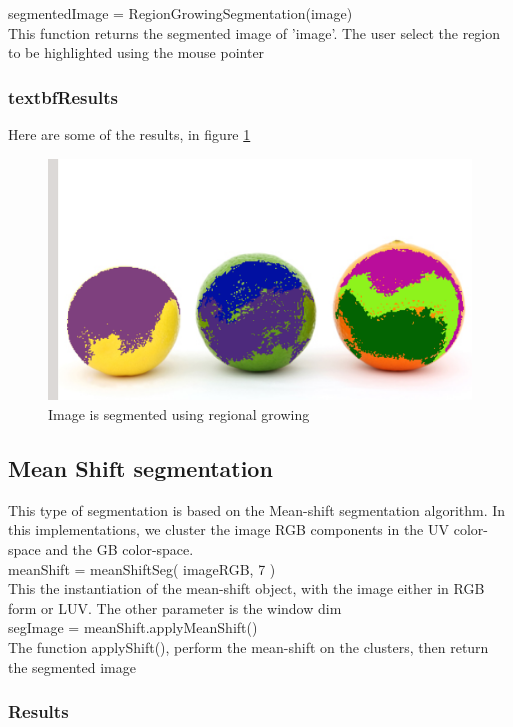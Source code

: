 \documentclass[letterpaper, 12 pt, conference ,onecolumn]{ieeeconf}  %
\begin{document}
segmentedImage = RegionGrowingSegmentation(image)
\\
This function returns the segmented image of 'image'. The user select the region to be highlighted using the mouse pointer
\subsubsection*{textbf{Results}}  

Here are some of the results, in figure \ref{fig:regional-growing}
\begin{figure}[h!]
\includegraphics[width=0.4\paperwidth]{regional-growing/regional-growing}
\centering
\caption{Image is segmented using regional growing }
\label{fig:regional-growing}
\end{figure}

\subsection*{Mean Shift segmentation}
This type of segmentation is based on the Mean-shift segmentation algorithm. In this  implementations, we cluster the image RGB components in the UV color-space and the GB color-space.
\\
meanShift = meanShiftSeg( imageRGB, 7 )
\\This the instantiation of the mean-shift object, with the image either in RGB form or LUV. The other parameter is the window dim 
\\
segImage = meanShift.applyMeanShift()
\\The function applyShift(), perform the mean-shift on the clusters, then return the segmented image

\subsubsection*{\textbf{Results}}  
\end{document}
